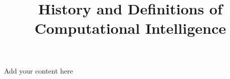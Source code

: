 \title{History and Definitions of Computational Intelligence}
\author{}
\institute{}
\maketitle
\label{chp:history}
\label{chp:definitions}


Add your content here





